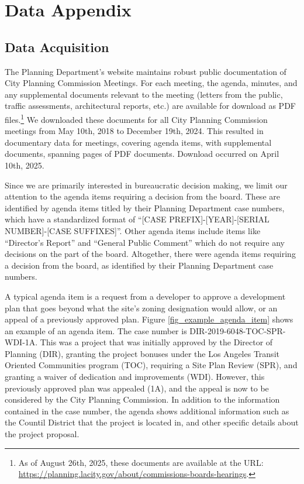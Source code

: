 \section{Data Appendix} \label{sec_data_appendix}

\subsection{Data Acquisition}

The Planning Department's website maintains robust public documentation of City Planning Commission Meetings. For each meeting, the agenda, minutes, and any supplemental documents relevant to the meeting (letters from the public, traffic assessments, architectural reports, etc.) are available for download as PDF files.\footnote{As of August 26th, 2025, these documents are available at the URL: \url{https://planning.lacity.gov/about/commissions-boards-hearings}.} We downloaded these documents for all City Planning Commission meetings from May 10th, 2018 to December 19th, 2024. This resulted in documentary data for  meetings, covering  agenda items, with  supplemental documents, spanning  pages of PDF documents. Download occurred on April 10th, 2025.

Since we are primarily interested in bureaucratic decision making, we limit our attention to the agenda items requiring a decision from the board. These are identified by agenda items titled by their Planning Department case numbers, which have a standardized format of ``[CASE PREFIX]-[YEAR]-[SERIAL NUMBER]-[CASE SUFFIXES]''. Other agenda items include items like ``Director's Report'' and ``General Public Comment'' which do not require any decisions on the part of the board. Altogether, there were  agenda items requiring a decision from the board, as identified by their Planning Department case numbers.

A typical agenda item is a request from a developer to approve a development plan that goes beyond what the site's zoning designation would allow, or an appeal of a previously approved plan. Figure \ref{fig_example_agenda_item} shows an example of an agenda item. The case number is DIR-2019-6048-TOC-SPR-WDI-1A. This was a project that was initially approved by the Director of Planning (DIR), granting the project bonuses under the Los Angeles Transit Oriented Communities program (TOC), requiring a Site Plan Review (SPR), and granting a waiver of dedication and improvements (WDI). However, this previously approved plan was appealed (1A), and the appeal is now to be considered by the City Planning Commission. In addition to the information contained in the case number, the agenda shows additional information such as the Countil District that the project is located in, and other specific details about the project proposal.

